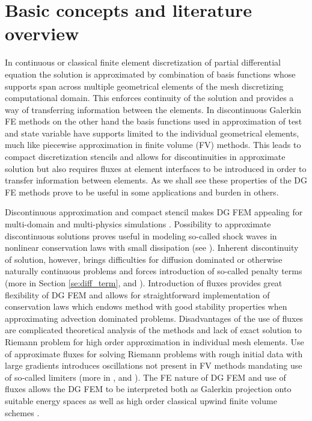 \section{Basic concepts and literature overview}
In continuous or classical finite element discretization of partial differential equation 
the solution is approximated by combination of basis functions whose supports span 
across multiple geometrical elements of the mesh discretizing computational domain. This 
enforces continuity of the solution and provides a way of transferring information 
between the elements. In discontinuous Galerkin FE methods on the other hand the 
basis functions used in approximation of test and state variable have supports limited to 
the individual geometrical elements, much like piecewise approximation in finite volume 
(FV) methods. This leads to compact discretization stencils and allows for 
discontinuities in approximate solution but also requires fluxes at element interfaces to 
be introduced in order to transfer information between elements. As we shall see these 
properties of the DG FE methods prove to be useful in some applications and burden in 
others.

Discontinuous approximation and compact stencil makes DG FEM appealing for 
multi-domain and multi-physics simulations \cite{DiPietro2012}.
Possibility to approximate discontinuous solutions proves useful in modeling so-called 
shock waves in nonlinear conservation laws with small dissipation \cite{Kucera}(see 
). Inherent discontinuity of solution, however, brings difficulties 
for diffusion 
dominated or otherwise naturally continuous problems and forces introduction of so-called 
penalty terms (more in Section \ref{se:diff_term}, \cite{Antonietti2013} and  
\cite{Kucera}). Introduction of fluxes provides great flexibility of DG FEM and allows 
for straightforward implementation of conservation laws which endows method with 
good stability properties when approximating advection dominated problems. 
Disadvantages of the use of fluxes are complicated theoretical analysis of the 
methods and lack of exact solution to Riemann problem for high order approximation in 
individual mesh elements. Use of approximate fluxes for solving Riemann problems with 
rough initial data with large gradients introduces oscillations not present in FV methods 
mandating use of so-called limiters (more in , \cite[Sec. 
3.2.4]{DiPietro2012} and \cite{Krivodonova2007}). The FE nature of DG FEM and use of 
fluxes allows the DG FEM to be interpreted both as Galerkin projection onto suitable 
energy spaces as well as high order classical upwind finite volume schemes 
\cite{Georgoulis2011}. 

